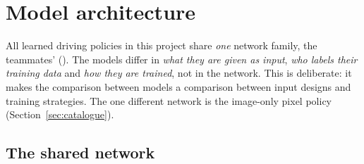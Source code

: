 \section{Model architecture}\label{sec:arch}

All learned driving policies in this project share \emph{one} network family, the teammates'  (). The models differ in \emph{what they are given as input}, \emph{who labels their training data} and \emph{how they are trained},
not in the network. This is deliberate: it makes the comparison between models a comparison between input designs and training strategies. The one different network is the image-only pixel policy (Section~\ref{sec:catalogue}).

\subsection{The shared network}
